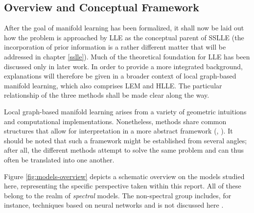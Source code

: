 \subsection{Overview and Conceptual Framework}
\label{principles-overview}

After the goal of manifold learning has been formalized, it shall now be laid 
out how the problem is approached by LLE as the conceptual parent of SSLLE 
(the incorporation of prior information is a rather different matter that will 
be addressed in chapter \ref{sslle}). 
Much of the theoretical foundation for LLE has been discussed only in later 
work.
In order to provide a more integrated background, explanations will therefore be 
given in a broader context of local graph-based manifold learning, which also 
comprises LEM and HLLE.
The particular relationship of the three methods shall be made clear along the 
way.

Local graph-based manifold learning arises from a variety of geometric 
intuitions and computational implementations.
Nonetheless, methods share common structures that allow for interpretation in a 
more abstract framework (\citet{bengioetal2003}, \citet{bengioetal2004}).
It should be noted that such a framework might be established from several 
angles; after all, the different methods attempt to solve the same problem 
and can thus often be translated into one another.

Figure \ref{fig:models-overview} depicts a schematic overview on the models 
studied here, representing the specific perspective taken within this report.
All of these belong to the realm of \textit{spectral} models.
The non-spectral group includes, for instance, techniques based on neural 
networks and is not discussed here \citep{vandermaatenetal2009}.

